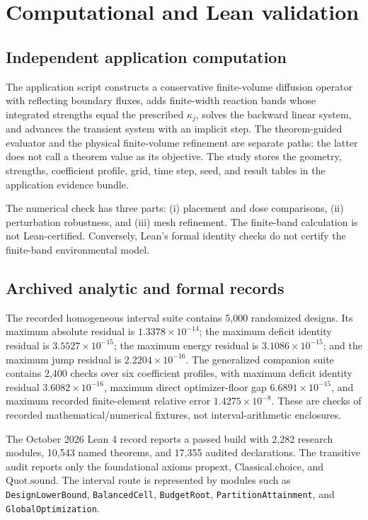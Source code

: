 \documentclass[10pt]{article}
\begin{document}
\section{Computational and Lean validation}

\subsection{Independent application computation}

The application script constructs a conservative finite-volume diffusion operator with reflecting boundary fluxes, adds finite-width reaction bands whose integrated strengths equal the prescribed $\kappa_j$, solves the backward linear system, and advances the transient system with an implicit step. The theorem-guided evaluator and the physical finite-volume refinement are separate paths: the latter does not call a theorem value as its objective. The study stores the geometry, strengths, coefficient profile, grid, time step, seed, and result tables in the application evidence bundle.

The numerical check has three parts: (i) placement and dose comparisons, (ii) perturbation robustness, and (iii) mesh refinement. The finite-band calculation is not Lean-certified. Conversely, Lean's formal identity checks do not certify the finite-band environmental model.

\subsection{Archived analytic and formal records}

The recorded homogeneous interval suite contains 5,000 randomized designs. Its maximum absolute residual is $1.3378\times10^{-14}$; the maximum deficit identity residual is $3.5527\times10^{-15}$; the maximum energy residual is $3.1086\times10^{-15}$; and the maximum jump residual is $2.2204\times10^{-16}$. The generalized companion suite contains 2,400 checks over six coefficient profiles, with maximum deficit identity residual $3.6082\times10^{-16}$, maximum direct optimizer-floor gap $6.6891\times10^{-15}$, and maximum recorded finite-element relative error $1.4275\times10^{-8}$. These are checks of recorded mathematical/numerical fixtures, not interval-arithmetic enclosures.

The October 2026 Lean 4 record reports a passed build with 2,282 research modules, 10,543 named theorems, and 17,355 audited declarations. The transitive audit reports only the foundational axioms $\mathrm{propext}$, $\mathrm{Classical.choice}$, and $\mathrm{Quot.sound}$. The interval route is represented by modules such as \texttt{DesignLowerBound}, \texttt{BalancedCell}, \texttt{BudgetRoot}, \texttt{PartitionAttainment}, and \texttt{GlobalOptimization}.
\end{document}
